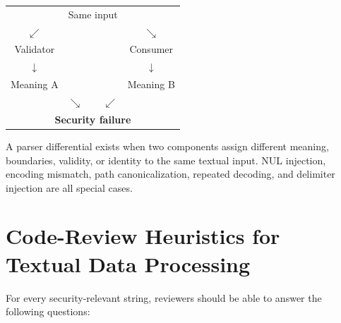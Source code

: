 \documentclass[11pt]{article}
\begin{document}
\begin{vulnpattern}
\begin{center}
\begin{tabular}{ccc}
& Same input & \\
\(\swarrow\) & & \(\searrow\) \\
Validator & & Consumer \\
\(\downarrow\) & & \(\downarrow\) \\
Meaning A & & Meaning B \\
\multicolumn{3}{c}{\(\searrow\quad\quad\swarrow\)} \\
\multicolumn{3}{c}{\textbf{Security failure}}
\end{tabular}
\end{center}

A parser differential exists when two components assign different meaning, boundaries, validity, or identity to the same textual input. NUL injection, encoding mismatch, path canonicalization, repeated decoding, and delimiter injection are all special cases.
\end{vulnpattern}
\clearpage

\section{Code-Review Heuristics for Textual Data Processing}

For every security-relevant string, reviewers should be able to answer the following questions:
\end{document}
